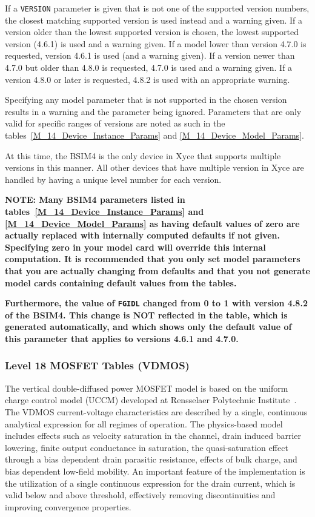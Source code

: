 If a \texttt{VERSION} parameter is given that is not one of the
supported version numbers, the closest matching supported version is
used instead and a warning given.  If a version older than the lowest
supported version is chosen, the lowest supported version (4.6.1) is
used and a warning given.  If a model lower than version 4.7.0 is
requested, version 4.6.1 is used (and a warning given).  If a version
newer than 4.7.0 but older than 4.8.0 is requested, 4.7.0 is used and
a warning given.  If a version 4.8.0 or later is requested, 4.8.2 is
used with an appropriate warning.

Specifying any model parameter that is
not supported in the chosen version results in a warning and the
parameter being ignored.  Parameters that are only valid for specific
ranges of versions are noted as such in the
tables~\ref{M_14_Device_Instance_Params} and
\ref{M_14_Device_Model_Params}.

At this time, the BSIM4 is the only device in Xyce that supports
multiple versions in this manner.  All other devices that have
multiple version in Xyce are handled by having a unique level number
for each version.

\textbf{NOTE: Many BSIM4 parameters listed in
  tables~\ref{M_14_Device_Instance_Params} and
  \ref{M_14_Device_Model_Params} as having default values of zero are
  actually replaced with internally computed defaults if not given.
  Specifying zero in your model card will override this internal
  computation.  It is recommended that you only set model parameters
  that you are actually changing from defaults and that you not
  generate model cards containing default values from the tables.
}

\textbf{
  Furthermore, the value of \texttt{FGIDL} changed from 0 to 1 with
  version 4.8.2 of the BSIM4.  This change is NOT reflected in the
  table, which is generated automatically, and which shows only the
  default value of this parameter that applies to versions 4.6.1 and
  4.7.0.}





\clearpage
\subsubsection{Level 18 MOSFET Tables (VDMOS)}
The vertical double-diffused power MOSFET model is based on the uniform charge
control model (UCCM) developed at Rensselaer Polytechnic Institute~\cite{Fjeldly:1998}.
The VDMOS current-voltage characteristics are described by a single, continuous
analytical expression for all regimes of operation.  The physics-based model
includes effects such as velocity saturation in the channel, drain induced barrier
lowering, finite output conductance in saturation, the quasi-saturation effect
through a bias dependent drain parasitic resistance, effects of bulk charge, and
bias dependent low-field mobility.  An important feature of the implementation
is the utilization of a single continuous expression for the drain current, which
is valid below and above threshold, effectively removing discontinuities and
improving convergence properties.

